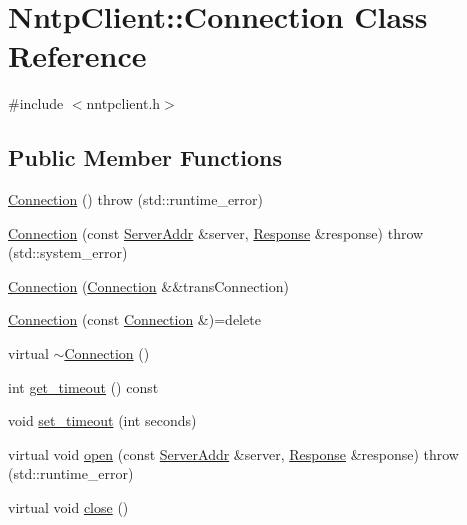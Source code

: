 \hypertarget{class_nntp_client_1_1_connection}{}\section{Nntp\+Client\+:\+:Connection Class Reference}
\label{class_nntp_client_1_1_connection}


{\ttfamily \#include $<$nntpclient.\+h$>$}

\subsection*{Public Member Functions}
\begin{DoxyCompactItemize}
\item 
\hyperlink{class_nntp_client_1_1_connection_adcf4522afd5361bf7c27a1c00825585a}{Connection} ()  throw (std\+::runtime\+\_\+error)
\item 
\hyperlink{class_nntp_client_1_1_connection_a78f4aedbe993d16ff65b850a3683de2c}{Connection} (const \hyperlink{class_nntp_client_1_1_server_addr}{Server\+Addr} \&server, \hyperlink{class_nntp_client_1_1_response}{Response} \&response)  throw (std\+::system\+\_\+error)
\item 
\hyperlink{class_nntp_client_1_1_connection_ac9d3d28905af4a394e70745ff2b74e72}{Connection} (\hyperlink{class_nntp_client_1_1_connection}{Connection} \&\&trans\+Connection)
\item 
\hyperlink{class_nntp_client_1_1_connection_af42bb1e5ff15c16c8779d10965d0e5d8}{Connection} (const \hyperlink{class_nntp_client_1_1_connection}{Connection} \&)=delete
\item 
virtual \hyperlink{class_nntp_client_1_1_connection_acc2047fde3c627a15501db0039d9d7e3}{$\sim$\+Connection} ()
\item 
int \hyperlink{class_nntp_client_1_1_connection_a4ff39dca9e9fa2c98a2d36bccfe2ddbf}{get\+\_\+timeout} () const
\item 
void \hyperlink{class_nntp_client_1_1_connection_a63ed1e33695a7c6e816346c7d275b65d}{set\+\_\+timeout} (int seconds)
\item 
virtual void \hyperlink{class_nntp_client_1_1_connection_ad41b4cb74ddbeacf838b0e0b20d692e5}{open} (const \hyperlink{class_nntp_client_1_1_server_addr}{Server\+Addr} \&server, \hyperlink{class_nntp_client_1_1_response}{Response} \&response)  throw (std\+::runtime\+\_\+error)
\item 
virtual void \hyperlink{class_nntp_client_1_1_connection_ac2e2693bf8693a71f8bcade6cc57dbfb}{close} ()

\end{DoxyCompactItemize}
